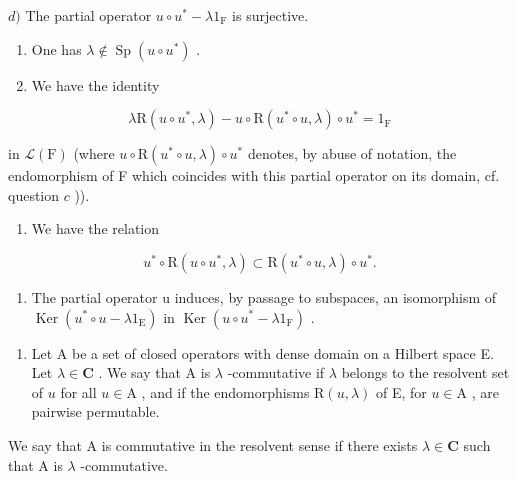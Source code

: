 \(d)\) The partial operator \(u \circ u^{*} - \lambda 1_{\mathrm{F}}\) is surjective.

\begin{enumerate}
\def\labelenumi{\alph{enumi})}
\setcounter{enumi}{4}
\item
  One has \(\lambda \notin \operatorname{Sp}(u \circ u^{*})\) .
\item
  We have the identity
\end{enumerate}

\[
\lambda \mathrm{R} (u \circ u ^ {*}, \lambda) - u \circ \mathrm{R} (u ^ {*} \circ u, \lambda) \circ u ^ {*} = 1 _ {\mathrm{F}}
\]

in \(\mathcal{L}(\mathrm{F})\) (where \(u\circ \mathrm{R}(u^{*}\circ u,\lambda)\circ u^{*}\) denotes, by abuse of notation, the endomorphism of F which coincides with this partial operator on its domain, cf. question \(c\) )).

\begin{enumerate}
\def\labelenumi{\alph{enumi})}
\setcounter{enumi}{6}
\tightlist
\item
  We have the relation
\end{enumerate}

\[
u ^ {*} \circ \mathrm{R} (u \circ u ^ {*}, \lambda) \subset \mathrm{R} (u ^ {*} \circ u, \lambda) \circ u ^ {*}.
\]

\begin{enumerate}
\def\labelenumi{\alph{enumi})}
\setcounter{enumi}{7}
\tightlist
\item
  The partial operator u induces, by passage to subspaces, an isomorphism of \(\operatorname{Ker}(u^{*} \circ u - \lambda1_{\mathrm{E}})\) in \(\operatorname{Ker}(u \circ u^{*} - \lambda1_{\mathrm{F}})\) .
\end{enumerate}

\begin{enumerate}
\def\labelenumi{\arabic{enumi})}
\setcounter{enumi}{6}
\tightlist
\item
  Let A be a set of closed operators with dense domain on a Hilbert space E. Let \(\lambda \in \mathbf{C}\) . We say that A is \(\lambda\) -commutative if \(\lambda\) belongs to the resolvent set of \(u\) for all \(u \in \mathrm{A}\) , and if the endomorphisms \(\mathrm{R}(u, \lambda)\) of E, for \(u \in \mathrm{A}\) , are pairwise permutable.
\end{enumerate}

We say that A is commutative in the resolvent sense if there exists \(\lambda \in \mathbf{C}\) such that A is \(\lambda\) -commutative.

